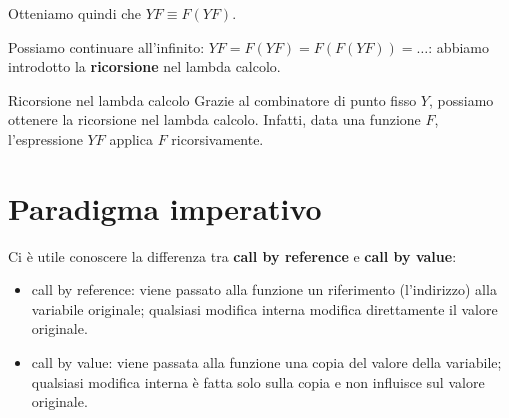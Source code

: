 \documentclass[a4paper,11pt]{report}
\begin{document}
  Otteniamo quindi che \( YF \equiv F(YF) \).

  Possiamo continuare all'infinito: \( YF = F(YF) = F(F(YF)) = \dots \): abbiamo introdotto la \textbf{ricorsione} nel lambda calcolo.

\begin{thmframe}{Ricorsione nel lambda calcolo}{}
    Grazie al combinatore di punto fisso \( Y \), possiamo ottenere la ricorsione nel lambda calcolo. Infatti, data una funzione \( F \), l'espressione \( YF \) applica \( F \) ricorsivamente.
\end{thmframe}


\chapter{Paradigma imperativo}

\begin{gframe}{}
    Ci è utile conoscere la differenza tra \textbf{call by reference} e \textbf{call by value}:
    \begin{itemize}
        \item call by reference: viene passato alla funzione un riferimento (l'indirizzo) alla variabile originale; qualsiasi modifica interna modifica direttamente il valore originale.
        \item  call by value: viene passata alla funzione una copia del valore della variabile; qualsiasi modifica interna è fatta solo sulla copia e non influisce sul valore originale.
    \end{itemize}


\end{gframe}
\end{document}
